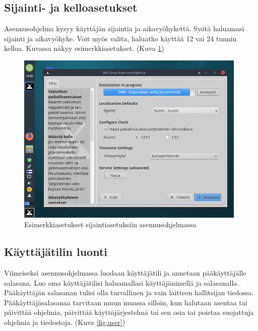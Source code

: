 \documentclass[a4paper, 12pt, finnish]{article}
\begin{document}
\subsection{Sijainti- ja kelloasetukset}

Asennusohjelma kysyy käyttäjän sijaintia ja aikavyöhykettä. Syötä haluamasi sijainti ja aikavyöhyke. Voit myös valita, haluatko käyttää 12 vai 24 tunnin kelloa. Kuvassa näkyy esimerkkiasetukset. (Kuva \ref{fig:locale})

\begin{figure}[htpb]
    \begin{center}
        \includegraphics[width=0.98\textwidth]{asen/asennus_locale}
        \caption{Esimerkkiasetukset sijaintiasetuksiin asennusohjelmassa}
        \label{fig:locale}
    \end{center}
\end{figure}

\subsection{Käyttäjätilin luonti}

Viimeiseksi asennusohjelmassa luodaan käyttäjätili ja annetaan pääkäyttäjälle salasana. Luo oma käyttäjätilisi haluamallasi käyttäjänimellä ja salasanalla.
Pääkäyttäjän salasanan tulisi olla turvallinen ja vain laitteen hallitsijan tiedossa.
Pääkäyttäjäsalasanaa tarvitaan muun muassa silloin, kun halutaan asentaa tai päivittää ohjelmia, päivittää käyttöjärjestelmä tai sen osia tai poistaa suojattuja ohjelmia ja tiedostoja. (Kuva \ref{fig:user})
\\
\end{document}
